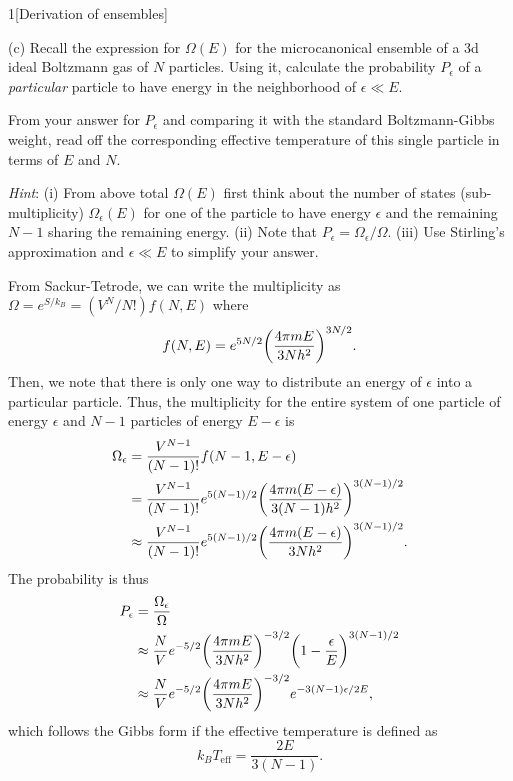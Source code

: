 \documentclass[12pt]{article}
\begin{document}
\begin{problem}{1}[Derivation of ensembles]

(c) Recall the expression for $\Omega(E)$ for the microcanonical ensemble of a
3d ideal Boltzmann gas of $N$ particles. Using it, calculate the probability
$P_\epsilon$ of a \textit{particular} particle to have energy in the
neighborhood of $\epsilon\ll E$.

From your answer for $P_\epsilon$ and comparing it with the standard
Boltzmann-Gibbs weight, read off the corresponding effective temperature of this
single particle in terms of $E$ and $N$.

\textit{Hint}: (i) From above total $\Omega(E)$ first think about the number of
states (sub-multiplicity) $\Omega_\epsilon(E)$ for one of the particle to have
energy $\epsilon$ and the remaining $N-1$ sharing the remaining energy. (ii)
Note that $P_\epsilon=\Omega_\epsilon/\Omega$. (iii) Use Stirling's
approximation and $\epsilon\ll E$ to simplify your answer.

\begin{solution}
From Sackur-Tetrode, we can write the multiplicity as $\Omega=e^{S/k_B}
=(V^N/N!)f(N,E)$ where
\begin{equation}
    f(N,E)=e^{5N/2}\qty(\frac{4\pi mE}{3Nh^2})^{3N/2}.
\end{equation}
Then, we note that there is only one way to distribute an energy of $\epsilon$
into a particular particle. Thus, the multiplicity for the entire system of one
particle of energy $\epsilon$ and $N-1$ particles of energy $E-\epsilon$ is
\begin{align}
    \Omega_\epsilon
    &=\frac{V^{N-1}}{(N-1)!}f(N-1,E-\epsilon)\notag\\
    &=\frac{V^{N-1}}{(N-1)!}e^{5(N-1)/2}\qty(\frac{4\pi
    m(E-\epsilon)}{3(N-1)h^2})^{3(N-1)/2}\notag\\
    &\approx\frac{V^{N-1}}{(N-1)!}e^{5(N-1)/2}\qty(\frac{4\pi
    m(E-\epsilon)}{3Nh^2})^{3(N-1)/2}.
\end{align}
The probability is thus
\begin{align}
    P_\epsilon
    &=\frac{\Omega_\epsilon}{\Omega}\notag\\
    &\approx\frac{N}{V}e^{-5/2}\qty(\frac{4\pi m E}{3Nh^2})^{-3/2}
        \qty(1-\frac{\epsilon}{E})^{3(N-1)/2}\notag\\
    &\approx\frac{N}{V}e^{-5/2}\qty(\frac{4\pi m E}{3Nh^2})^{-3/2}
        e^{-3(N-1)\epsilon/2E},
\end{align}
which follows the Gibbs form if the effective temperature is defined as
\begin{equation}
    k_BT_\text{eff}=\frac{2E}{3(N-1)}.
\end{equation}
\end{solution}


\end{problem}
\end{document}
